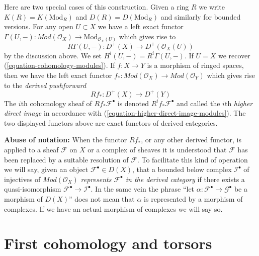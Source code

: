 \medskip\noindent
Here are two special cases of this construction.
Given a ring $R$ we write $K(R) = K(\text{Mod}_R)$ and
$D(R) = D(\text{Mod}_R)$ and similarly for bounded versions.
For any open $U \subset X$ we have a left exact functor
$
\Gamma(U, -) :
\textit{Mod}(\mathcal{O}_X)
\longrightarrow
\text{Mod}_{\mathcal{O}_X(U)}
$
which gives rise to
\begin{equation}
\label{equation-total-derived-cohomology}
R\Gamma(U, -) :
D^{+}(X)
\longrightarrow
D^{+}(\mathcal{O}_X(U))
\end{equation}
by the discussion above. We set $H^i(U, -) = R^i\Gamma(U, -)$.
If $U = X$ we recover (\ref{equation-cohomology-modules}).
If $f : X \to Y$ is a morphism of ringed spaces, then we have
the left exact functor
$
f_* :
\textit{Mod}(\mathcal{O}_X)
\longrightarrow
\textit{Mod}(\mathcal{O}_Y)
$
which gives rise to the {\it derived pushforward}
\begin{equation}
\label{equation-total-derived-direct-image}
Rf_* :
D^{+}(X)
\longrightarrow
D^{+}(Y)
\end{equation}
The $i$th cohomology sheaf of $Rf_*\mathcal{F}^\bullet$ is denoted
$R^if_*\mathcal{F}^\bullet$ and called the $i$th {\it higher direct image}
in accordance with (\ref{equation-higher-direct-image-modules}).
The two displayed functors above are exact functors
of derived categories.

\medskip\noindent
{\bf Abuse of notation:} When the functor $Rf_*$, or any other
derived functor, is applied to a sheaf $\mathcal{F}$ on $X$ or a complex
of sheaves it is understood that $\mathcal{F}$ has been replaced by a
suitable resolution of $\mathcal{F}$. To facilitate this kind of
operation we will say, given an object $\mathcal{F}^\bullet \in D(X)$,
that a bounded below complex $\mathcal{I}^\bullet$ of injectives of
$\textit{Mod}(\mathcal{O}_X)$
{\it represents $\mathcal{F}^\bullet$ in the derived category}
if there exists a quasi-isomorphism
$\mathcal{F}^\bullet \to \mathcal{I}^\bullet$. In the same vein the phrase
``let $\alpha : \mathcal{F}^\bullet \to \mathcal{G}^\bullet$ be
a morphism of $D(X)$'' does not mean that $\alpha$ is represented by a
morphism of complexes. If we have an actual morphism of complexes we will
say so.









\section{First cohomology and torsors}
\label{section-h1-torsors}

